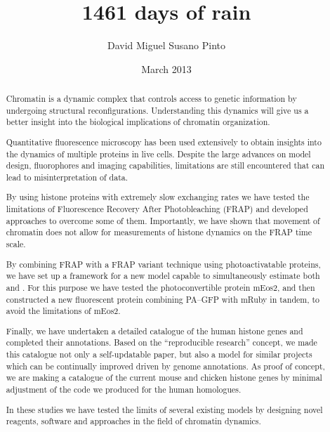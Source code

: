 \documentclass[a4paper,twoside,openright]{memoir}
\author{David Miguel Susano Pinto}
\date{March 2013} %
\title{1461 days of rain} %
\begin{document}
  \frontmatter

  \maketitle

  \dedication{The leprechaun made me do it.}

  \clearpage
  \tableofcontents
  \clearpage
  \listoffigures
  \clearpage
  \listoftables

  \clearpage
  \begin{abstract}  %

    Chromatin is a dynamic complex that controls access to genetic information by
    undergoing structural reconfigurations. Understanding this dynamics will give
    us a better insight into the biological implications of chromatin organization.

    Quantitative fluorescence microscopy has been used extensively to obtain insights
    into the dynamics of multiple proteins in live cells. Despite the large advances on
    model design, fluorophores and imaging capabilities, limitations are still
    encountered that can lead to misinterpretation of data.

    By using histone proteins with extremely slow exchanging rates we have tested the
    limitations of Fluorescence Recovery After Photobleaching (FRAP) and developed
    approaches to overcome some of them. Importantly, we have shown that movement of
    chromatin does not allow for measurements of histone dynamics on the FRAP time scale.

    By combining FRAP with a FRAP variant technique using photoactivatable proteins, we have
    set up a framework for a new model capable to simultaneously estimate both \Kon
    and \Koff. For this purpose we have tested the photoconvertible protein mEos2,
    and then constructed a new fluorescent protein combining PA--GFP with mRuby in tandem,
    to avoid the limitations of mEos2.

    Finally, we have undertaken a detailed catalogue of the human histone genes and completed
    their annotations. Based on the ``reproducible research'' concept, we made this
    catalogue not only a self-updatable paper, but also a model for similar projects
    which can be continually improved driven by genome annotations. As proof of concept, we
    are making a catalogue of the current mouse and chicken histone genes by minimal
    adjustment of the code we produced for the human homologues.

    In these studies we have tested the limits of several existing models by designing
    novel reagents, software and approaches in the field of chromatin dynamics.

  \end{abstract}
\end{document}
